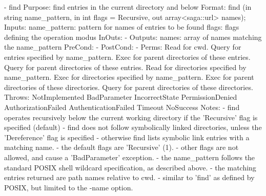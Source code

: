 \begin{myspec}
 
    - find
      Purpose:  find entries in the current directory and below
      Format:   find               (in  string  name_pattern,
                                    in  int     flags = Recursive,
                                    out array<saga::url> names);
      Inputs:   name_pattern:       pattern for names of
                                    entries to be found
                flags:              flags defining the operation
                                    modus
      InOuts:   -
      Outputs:  names:              array of names matching the
                                    name_pattern
      PreCond:  -
      PostCond: -
      Perms:    Read  for cwd.
                Query for entries specified by name_pattern.
                Exec  for parent directories of these entries.
                Query for parent directories of these entries.
                Read  for directories specified by name_pattern.
                Exec  for directories specified by name_pattern.
                Exec  for parent directories of these directories.
                Query for parent directories of these directories.
      Throws:   NotImplemented
                BadParameter
                IncorrectState
                PermissionDenied
                AuthorizationFailed
                AuthenticationFailed
                Timeout
                NoSuccess
      Notes:    - find operates recursively below the current
                  working directory if the 'Recursive' flag is
                  specified (default)
                - find does not follow symbolically linked
                  directories, unless the 'Dereference' flag
                  is specified - otherwise find lists symbolic 
                  link entries with a matching name.
                - the default flags are 'Recursive' (1).
                - other flags are not allowed, and cause a
                  'BadParameter' exception.
                - the name_pattern follows the standard POSIX 
                  shell wildcard specification, as described 
                  above.
                - the matching entries returned are path names 
                  relative to cwd.
                - similar to 'find' as defined by POSIX, but
                  limited to the -name option.
 

\end{myspec}
